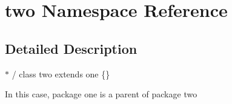 \hypertarget{namespacetwo}{\section{two \-Namespace \-Reference}
\label{namespacetwo}
}


\subsection{\-Detailed \-Description}
$\ast$ / class two extends one \{\} 

\-In this case, package one is a parent of package two 